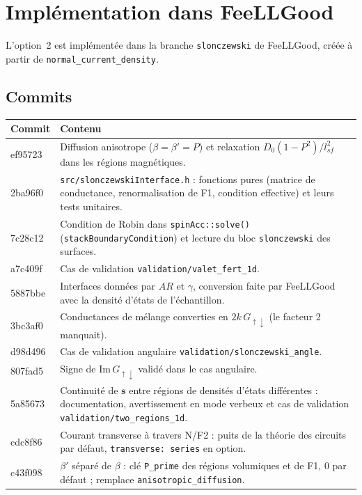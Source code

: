 \documentclass[11pt,a4paper]{article}
\newcommand{\vs}{\bm{s}}
\begin{document}
\section{Implémentation dans FeeLLGood}
\label{sec:implementation}

L'option~2 est implémentée dans la branche \texttt{slonczewski} de
FeeLLGood, créée à partir de \texttt{normal\_current\_density}.

\subsection{Commits}

\begin{center}
\renewcommand{\arraystretch}{1.2}
\begin{tabular}{>{\ttfamily}l>{\raggedright\arraybackslash}p{11.5cm}}
  \toprule
  \textrm{Commit} & Contenu \\
  \midrule
  ef95723 & Diffusion anisotrope ($\beta=\beta'=P$) et relaxation
            $D_0(1-P^2)/l_{sf}^2$ dans les régions magnétiques. \\
  2ba96f0 & \texttt{src/slonczewskiInterface.h} : fonctions pures
            (matrice de conductance, renormalisation de F1, condition
            effective) et leurs tests unitaires. \\
  7c28c12 & Condition de Robin dans \texttt{spinAcc::solve()}
            (\texttt{stackBoundaryCondition}) et lecture du bloc
            \texttt{slonczewski} des surfaces. \\
  a7c409f & Cas de validation \texttt{validation/valet\_fert\_1d}. \\
  5887bbe & Interfaces données par $AR$ et $\gamma$, conversion faite par
            FeeLLGood avec la densité d'états de l'échantillon. \\
  3bc3af0 & Conductances de mélange converties en
            $2k\,G_{\uparrow\downarrow}$ (le facteur 2 manquait). \\
  d98d496 & Cas de validation angulaire
            \texttt{validation/slonczewski\_angle}. \\
  807fad5 & Signe de $\mathrm{Im}\,G_{\uparrow\downarrow}$ validé dans le cas
            angulaire. \\
  5a85673 & Continuité de $\vs$ entre régions de densités d'états
            différentes : documentation, avertissement en mode verbeux et
            cas de validation \texttt{validation/two\_regions\_1d}. \\
  cdc8f86 & Courant transverse à travers N/F2 : puits de la
            théorie des circuits par défaut, \texttt{transverse: series}
            en option. \\
  c43f098 & $\beta'$ séparé de $\beta$ : clé \texttt{P\_prime} des régions
            volumiques et de F1, 0 par défaut ; remplace
            \texttt{anisotropic\_diffusion}. \\
  \bottomrule
\end{tabular}
\end{center}
\end{document}
